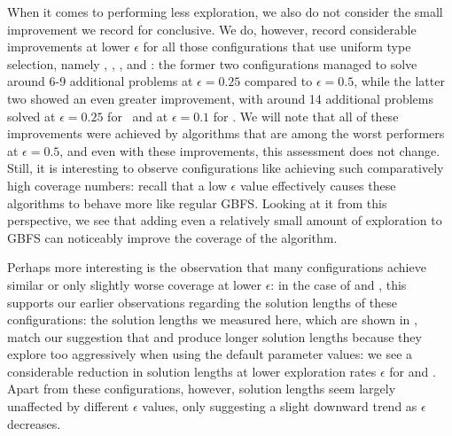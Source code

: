 When it comes to performing less exploration, we also do not consider the small improvement we record for \hgUu conclusive. We do, however, record considerable improvements at lower $\epsilon$ for all those configurations that use uniform type selection, namely \hiUh, \lwUu, \hiUu, and \lwUh: the former two configurations managed to solve around 6-9 additional problems at $\epsilon=0.25$ compared to $\epsilon=0.5$, while the latter two showed an even greater improvement, with around 14 additional problems solved at $\epsilon=0.25$ for \lwUh\ and at $\epsilon=0.1$ for \hiUu. We will note that all of these improvements were achieved by algorithms that are among the worst performers at $\epsilon=0.5$, and even with these improvements, this assessment does not change. Still, it is interesting to observe configurations like \hiUu achieving such comparatively high coverage numbers: recall that a low $\epsilon$ value effectively causes these algorithms to behave more like regular GBFS. Looking at it from this perspective, we see that adding even a relatively small amount of exploration to GBFS can noticeably improve the coverage of the algorithm.

Perhaps more interesting is the observation that many configurations achieve similar or only slightly worse coverage at lower $\epsilon$: in the case of \hiDu and \hiDh, this supports our earlier observations regarding the solution lengths of these configurations: the solution lengths we measured here, which are shown in , match our suggestion that \hiDu and \hiDh produce longer solution lengths because they explore too aggressively when using the default parameter values: we see a considerable reduction in solution lengths at lower exploration rates $\epsilon$ for \hiDu and \hiDh. Apart from these configurations, however, solution lengths seem largely unaffected by different $\epsilon$ values, only suggesting a slight downward trend as $\epsilon$ decreases.

